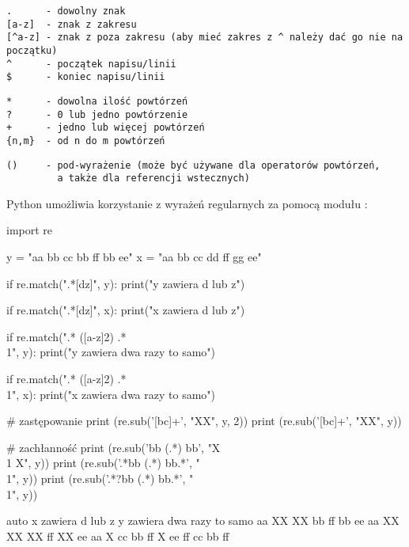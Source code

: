 \vspace{-6pt}\begin{Verbatim}
.      - dowolny znak
[a-z]  - znak z zakresu
[^a-z] - znak z poza zakresu (aby mieć zakres z ^ należy dać go nie na początku)
^      - początek napisu/linii
$      - koniec napisu/linii
\end{Verbatim}
\vspace{-8pt}\begin{Verbatim}
*      - dowolna ilość powtórzeń
?      - 0 lub jedno powtórzenie
+      - jedno lub więcej powtórzeń
{n,m}  - od n do m powtórzeń
\end{Verbatim}
\vspace{-8pt}\begin{Verbatim}
()     - pod-wyrażenie (może być używane dla operatorów powtórzeń,
         a także dla referencji wstecznych)
\end{Verbatim}

\pagebreak[2]\noindent
Python umożliwia korzystanie z wyrażeń regularnych za pomocą modułu :

\begin{CodeFrame}[python]{0.57\textwidth}
import re

y = "aa bb cc bb ff bb ee"
x = "aa bb cc dd ff gg ee"

if re.match(".*[dz]", y):
  print("y zawiera d lub z")

if re.match(".*[dz]", x):
  print("x zawiera d lub z")

if re.match(".* ([a-z]{2}) .* \\1", y):
  print("y zawiera dwa razy to samo")

if re.match(".* ([a-z]{2}) .* \\1", x):
  print("x zawiera dwa razy to samo")

# zastępowanie
print (re.sub('[bc]+', "XX", y, 2))
print (re.sub('[bc]+', "XX", y))

# zachłanność
print (re.sub('bb (.*) bb', "X \\1 X", y))
print (re.sub('.*bb (.*) bb.*', "\\1", y))
print (re.sub('.*?bb (.*) bb.*', "\\1", y))
\end{CodeFrame}
\begin{CodeFrame}{auto}
x zawiera d lub z
y zawiera dwa razy to samo
aa XX XX bb ff bb ee
aa XX XX XX ff XX ee
aa X cc bb ff X ee
ff
cc bb ff
\end{CodeFrame}

